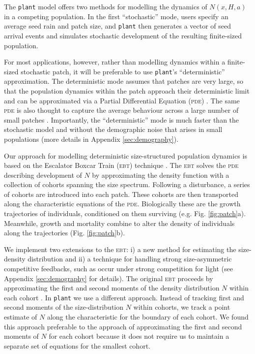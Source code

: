 \documentclass[a4paper,11pt]{article}
\newcommand{\plant}{\texttt{plant}}
\begin{document}
The {\plant} model offers two methods for modelling the dynamics of \(N(x,
H, a)\) in a competing population. In the first ``stochastic'' mode, users
specify an average seed rain and patch size, and {\plant} then generates a
vector of seed arrival events and simulates stochastic
development of the resulting finite-sized population.

For most applications, however, rather than modelling
dynamics within a finite-sized stochastic patch, it will be preferable to use {\plant}'s
``deterministic'' approximation. The deterministic mode assumes that
patches are very large, so that the population dynamics within the
patch approach their deterministic limit and can
be approximated via a Partial Differential Equation (\textsc{pde})
\citep{Deroos-1997, Kohyama-1993}.  The same \textsc{pde} is also thought to
capture the average behaviour across a large number of small patches
\citep{Moorcroft-2001}. Importantly, the ``deterministic'' mode is
much faster than the stochastic model and without the demographic noise
that arises in small populations (more details in Appendix \ref{sec:demography}).

Our approach for modelling deterministic size-structured population dynamics is
based on the Escalator Boxcar Train (\textsc{ebt}) technique
\citep{Deroos-1988, Deroos-1992, Deroos-1997, Brannstrom-2013}. The \textsc{ebt} solves
the \textsc{pde} describing development of \(N\) by approximating the
density function with a collection of cohorts spanning the size
spectrum. Following a disturbance, a series of cohorts are introduced
into each patch. These cohorts are then transported along the
characteristic equations of the \textsc{pde}. Biologically these are
the growth trajectories of individuals, conditioned on them surviving
(e.g. Fig. \ref{fig:patch}a). Meanwhile, growth and mortality combine
to alter the density of individuals along the trajectories
(Fig. \ref{fig:patch}b).

We implement two extensions to the \textsc{ebt}: i) a new method for
estimating the size-density distribution and ii) a technique for
handling strong size-asymmetric competitive feedbacks, such as occur
under strong competition for light (see Appendix \ref{sec:demography}
for details). The original \textsc{ebt} proceeds by approximating the
first and second moments of the density distribution \(N\) within each
cohort \citep{Deroos-1997}.
%
In {\plant} we use a different approach. Instead of tracking first and
second moments of the size-distribution \(N\) within cohorts, we track a
point estimate of \(N\) along the characteristic for the boundary of
each cohort. We found this approach preferable to the approach of
approximating the first and second moments of \(N\) for each cohort
because it does not require us to maintain a separate set of equations for the smallest
cohort.
\end{document}
